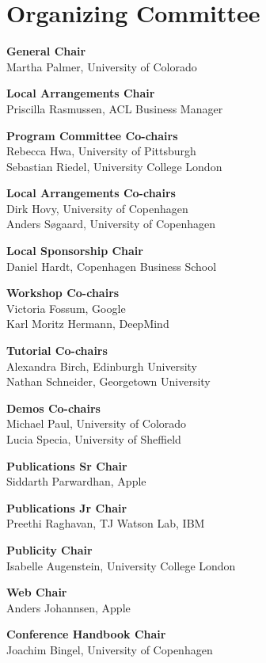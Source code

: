 \markboth{}{} %
\markright{}{} %

\section{Organizing Committee}{}

\setlength{\parindent}{0pt}

{\bf General Chair} \\
Martha Palmer, University of Colorado

{\bf Local Arrangements Chair} \\
Priscilla Rasmussen, ACL Business Manager

{\bf Program Committee Co-chairs} \\
Rebecca Hwa, University of Pittsburgh \\
Sebastian Riedel, University College London

{\bf Local Arrangements Co-chairs} \\
Dirk Hovy, University of Copenhagen \\
Anders S{\o}gaard, University of Copenhagen

{\bf Local Sponsorship Chair} \\
Daniel Hardt, Copenhagen Business School

{\bf Workshop Co-chairs} \\
Victoria Fossum, Google\\
Karl Moritz Hermann, DeepMind

{\bf Tutorial Co-chairs} \\
Alexandra Birch, Edinburgh University \\
Nathan Schneider, Georgetown University

{\bf Demos Co-chairs} \\
Michael Paul, University of Colorado \\
Lucia Specia, University of Sheffield

{\bf Publications Sr Chair} \\
Siddarth Parwardhan, Apple

{\bf Publications Jr Chair} \\
Preethi Raghavan, TJ Watson Lab, IBM

{\bf Publicity Chair}\\
Isabelle Augenstein, University College London

{\bf Web Chair}\\
Anders Johannsen, Apple

{\bf Conference Handbook Chair}\\
Joachim Bingel, University of Copenhagen

